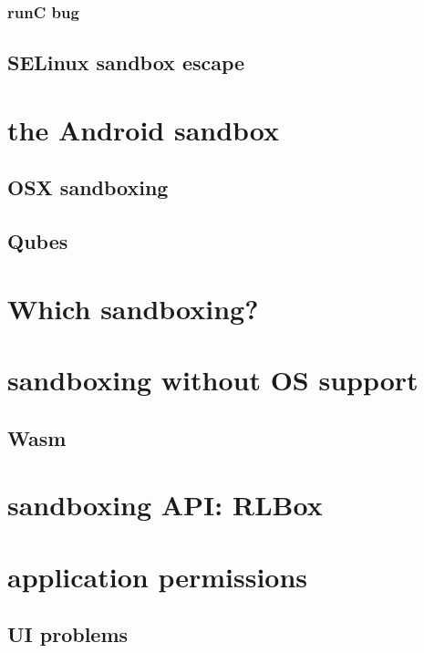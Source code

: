 \subsubsection{runC bug}


\subsection{SELinux sandbox escape}

\section{the Android sandbox}



\subsection{OSX sandboxing}

\subsection{Qubes}


\section{Which sandboxing?}


\section{sandboxing without OS support}


\subsection{Wasm}



\section{sandboxing API: RLBox}


\section{application permissions}


\subsection{UI problems}


